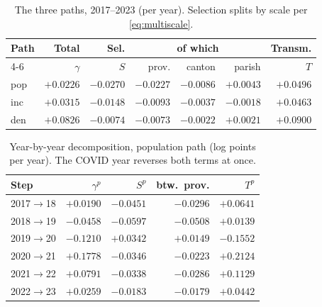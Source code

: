 \documentclass[conference]{IEEEtran}
\begin{document}
\begin{table}[h!]
\caption{The three paths, 2017--2023 (per year). Selection splits by scale
per \eqref{eq:multiscale}.}
\label{tab:threepaths}
\centering
\footnotesize
\setlength{\tabcolsep}{3pt}
\begin{tabular}{lrrrrrr}
\toprule
Path & Total & Sel. & \multicolumn{3}{c}{of which} & Transm. \\
\cmidrule(lr){4-6}
 & $\gamma$ & $S$ & prov. & canton & parish & $T$ \\
\midrule
pop  & $+0.0226$ & $-0.0270$ & $-0.0227$ & $-0.0086$ & $+0.0043$ & $+0.0496$ \\
inc  & $+0.0315$ & $-0.0148$ & $-0.0093$ & $-0.0037$ & $-0.0018$ & $+0.0463$ \\
den  & $+0.0826$ & $-0.0074$ & $-0.0073$ & $-0.0022$ & $+0.0021$ & $+0.0900$ \\
\bottomrule
\end{tabular}
\end{table}

\begin{table}[h!]
\caption{Year-by-year decomposition, population path (log points per
year). The COVID year reverses both terms at once.}
\label{tab:annual}
\centering
\small
\begin{tabular}{lrrrr}
\toprule
Step & $\gamma^{p}$ & $S^{p}$ & btw.\ prov. & $T^{p}$ \\
\midrule
2017$\to$18 & $+0.0190$ & $-0.0451$ & $-0.0296$ & $+0.0641$ \\
2018$\to$19 & $-0.0458$ & $-0.0597$ & $-0.0508$ & $+0.0139$ \\
2019$\to$20 & $-0.1210$ & $\mathbf{+0.0342}$ & $+0.0149$ & $\mathbf{-0.1552}$ \\
2020$\to$21 & $+0.1778$ & $-0.0346$ & $-0.0223$ & $+0.2124$ \\
2021$\to$22 & $+0.0791$ & $-0.0338$ & $-0.0286$ & $+0.1129$ \\
2022$\to$23 & $+0.0259$ & $-0.0183$ & $-0.0179$ & $+0.0442$ \\
\bottomrule
\end{tabular}
\end{table}
\newpage
\end{document}
